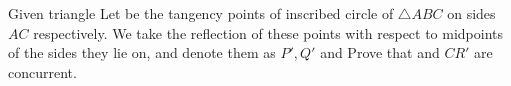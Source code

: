 Given triangle  Let    be the tangency points of inscribed circle of $\triangle ABC$ on sides   $AC$ respectively. We take the reflection of these points with respect to midpoints of the sides they lie on, and denote them as $P',Q'$ and  Prove that   and $CR'$ are concurrent.
